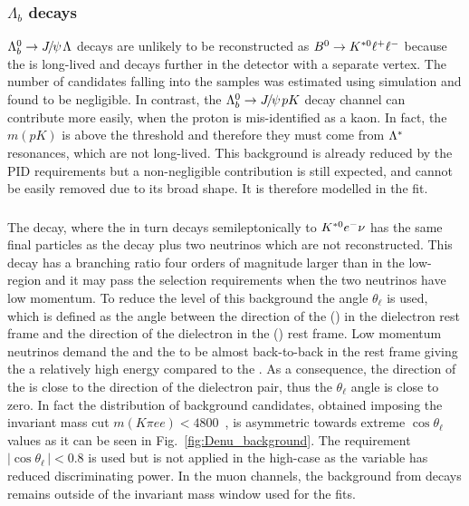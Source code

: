 \subsubsection{$\Lambda_b$ decays}

$\Lb\to\jpsi\Lz$ decays are unlikely to be reconstructed as ${{B}^0} \rightarrow {\ensuremath{{K}^{*0}}} \ell^+ \ell^-$ because
the \Lz is long-lived and decays further in the detector with a separate vertex.
The number of candidates falling into the \Bz samples was estimated using simulation and found to be negligible. 
In contrast, the $\Lb\to\jpsi pK$ decay channel can contribute more easily, when the proton is mis-identified as a kaon.
In fact, the $m(pK)$ is above the \Lz threshold and therefore they must come from ${\Lambda}^*$ resonances, 
 which are not long-lived. This background is already reduced by the PID requirements but a non-negligible contribution 
 is still expected, and cannot be easily removed due to its broad shape. It is therefore modelled in the fit.

\subsubsection{ }

The \decay{\Bd}{\Dm\ep\nu} decay, where the \Dm in turn decays semileptonically to ${{K}^{*0}}{e^-}\nu$ has the same final particles
as the \BdToKstee decay plus two neutrinos which are not reconstructed. This decay has a branching ratio four orders of magnitude
larger than \BdToKstee in the low-\qsq region and it may pass the selection requirements when the two neutrinos have low momentum. 
To reduce the level of this background the angle $\theta_\ell$ is used, which is defined as the angle between the direction of the \ep (\en)
in the dielectron rest frame and the direction of the dielectron in the \Bd (\Bdb) rest frame. 
Low momentum neutrinos demand the \Dm and the \ep to be almost back-to-back in the \Bd rest frame giving the \ep a relatively
high energy compared to the \en. As a consequence, the direction of the \ep is close to the direction of the dielectron pair, thus the
$\theta_\ell$ angle is close to zero. In fact the distribution of background candidates, obtained imposing the invariant mass cut
$m(K\pi ee) < 4800$~\mevcc, is asymmetric towards extreme $\cos \theta_\ell$ values as it can be seen in Fig.~\ref{fig:Denu_background}. 
The requirement $|\cos \theta_\ell\,|< 0.8$ is used but is not applied in the high-\qsq case as the variable has reduced discriminating power.
In the muon channels, the background from  decays remains outside 
of the invariant mass window used for the fits.

